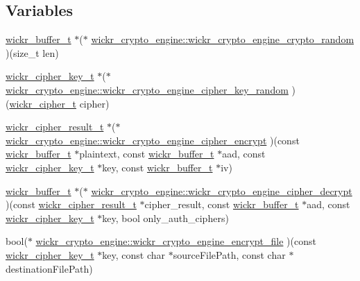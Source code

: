 \subsection*{Variables}
\begin{DoxyCompactItemize}
\item 
\mbox{\hyperlink{structwickr__buffer}{wickr\+\_\+buffer\+\_\+t}} $\ast$($\ast$ \mbox{\hyperlink{group__wickr__crypto__engine_gae12855853c05caa473e748a62611d307}{wickr\+\_\+crypto\+\_\+engine\+::wickr\+\_\+crypto\+\_\+engine\+\_\+crypto\+\_\+random}} )(size\+\_\+t len)
\item 
\mbox{\hyperlink{structwickr__cipher__key}{wickr\+\_\+cipher\+\_\+key\+\_\+t}} $\ast$($\ast$ \mbox{\hyperlink{group__wickr__crypto__engine_gabc120effc5248a491b18138f9b74b526}{wickr\+\_\+crypto\+\_\+engine\+::wickr\+\_\+crypto\+\_\+engine\+\_\+cipher\+\_\+key\+\_\+random}} )(\mbox{\hyperlink{structwickr__cipher}{wickr\+\_\+cipher\+\_\+t}} cipher)
\item 
\mbox{\hyperlink{structwickr__cipher__result}{wickr\+\_\+cipher\+\_\+result\+\_\+t}} $\ast$($\ast$ \mbox{\hyperlink{group__wickr__crypto__engine_gaf7be0d0ca0d9e7a0c5c3b1ec0fd0918e}{wickr\+\_\+crypto\+\_\+engine\+::wickr\+\_\+crypto\+\_\+engine\+\_\+cipher\+\_\+encrypt}} )(const \mbox{\hyperlink{structwickr__buffer}{wickr\+\_\+buffer\+\_\+t}} $\ast$plaintext, const \mbox{\hyperlink{structwickr__buffer}{wickr\+\_\+buffer\+\_\+t}} $\ast$aad, const \mbox{\hyperlink{structwickr__cipher__key}{wickr\+\_\+cipher\+\_\+key\+\_\+t}} $\ast$key, const \mbox{\hyperlink{structwickr__buffer}{wickr\+\_\+buffer\+\_\+t}} $\ast$iv)
\item 
\mbox{\hyperlink{structwickr__buffer}{wickr\+\_\+buffer\+\_\+t}} $\ast$($\ast$ \mbox{\hyperlink{group__wickr__crypto__engine_ga459ef821cc40edb5e3c9ce1d571ddc00}{wickr\+\_\+crypto\+\_\+engine\+::wickr\+\_\+crypto\+\_\+engine\+\_\+cipher\+\_\+decrypt}} )(const \mbox{\hyperlink{structwickr__cipher__result}{wickr\+\_\+cipher\+\_\+result\+\_\+t}} $\ast$cipher\+\_\+result, const \mbox{\hyperlink{structwickr__buffer}{wickr\+\_\+buffer\+\_\+t}} $\ast$aad, const \mbox{\hyperlink{structwickr__cipher__key}{wickr\+\_\+cipher\+\_\+key\+\_\+t}} $\ast$key, bool only\+\_\+auth\+\_\+ciphers)
\item 
bool($\ast$ \mbox{\hyperlink{group__wickr__crypto__engine_gaa77b1bc373d92d9db9d801bcc4a4d29c}{wickr\+\_\+crypto\+\_\+engine\+::wickr\+\_\+crypto\+\_\+engine\+\_\+encrypt\+\_\+file}} )(const \mbox{\hyperlink{structwickr__cipher__key}{wickr\+\_\+cipher\+\_\+key\+\_\+t}} $\ast$key, const char $\ast$source\+File\+Path, const char $\ast$destination\+File\+Path)

\end{DoxyCompactItemize}
